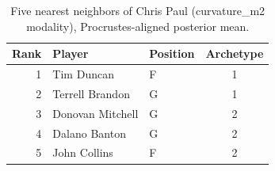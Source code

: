 \begin{table}[htbp]
  \centering\small
  \begin{tabular}{rllc}
    \toprule
    Rank & Player & Position & Archetype \\
    \midrule
    1 & Tim Duncan & F & 1 \\
    2 & Terrell Brandon & G & 1 \\
    3 & Donovan Mitchell & G & 2 \\
    4 & Dalano Banton & G & 2 \\
    5 & John Collins & F & 2 \\
    \bottomrule
  \end{tabular}
  \caption{Five nearest neighbors of Chris Paul (curvature_m2 modality), Procrustes-aligned posterior mean.}
  \label{tab:Chris_Paul_neighbors_curvature_m2}
\end{table}

